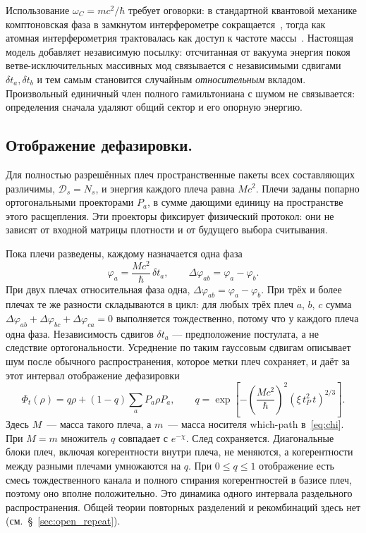 \documentclass[12pt,a4paper]{article}
\begin{document}
Использование $\omega_C=mc^2/\hbar$ требует оговорки: в стандартной квантовой механике комптоновская фаза в замкнутом интерферометре сокращается~\cite{wolf2011compton}, тогда как атомная интерферометрия трактовалась как доступ к частоте массы~\cite{lan2013clock}. Настоящая модель добавляет независимую посылку: отсчитанная от вакуума энергия покоя ветве-исключительных массивных мод связывается с независимыми сдвигами $\delta t_a,\delta t_b$ и тем самым становится случайным \emph{относительным} вкладом. Произвольный единичный член полного гамильтониана с шумом не связывается: определения сначала удаляют общий сектор и его опорную энергию.

\subsection{Отображение дефазировки.}
\label{sec:map}
Для полностью разрешённых плеч пространственные пакеты всех составляющих различимы, $\mathcal D_s=N_s$, и энергия каждого плеча равна $Mc^2$. Плечи заданы попарно ортогональными проекторами $P_a$, в сумме дающими единицу на пространстве этого расщепления. Эти проекторы фиксирует физический протокол: они не зависят от входной матрицы плотности и от будущего выбора считывания.

Пока плечи разведены, каждому назначается одна фаза
\begin{equation}
\varphi_a=\frac{Mc^2}{\hbar}\,\delta t_a,
\qquad
\Delta\varphi_{ab}=\varphi_a-\varphi_b.
\label{eq:arm_phase}
\end{equation}
При двух плечах относительная фаза одна, $\Delta\varphi_{ab}=\varphi_a-\varphi_b$. При трёх и более плечах те же разности складываются в цикл: для любых трёх плеч $a$, $b$, $c$ сумма $\Delta\varphi_{ab}+\Delta\varphi_{bc}+\Delta\varphi_{ca}=0$ выполняется тождественно, потому что у каждого плеча одна фаза. Независимость сдвигов $\delta t_a$ --- предположение постулата, а не следствие ортогональности. Усреднение по таким гауссовым сдвигам описывает шум после обычного распространения, которое метки плеч сохраняет, и даёт за этот интервал отображение дефазировки
\begin{equation}
\Phi_t(\rho)=q\rho+(1-q)\sum_a P_a\rho P_a,
\qquad
q=\exp\!\left[-\left(\frac{Mc^2}{\hbar}\right)^2
(\xi\,t_P^2\,t)^{2/3}\right].
\label{eq:phi_map}
\end{equation}
Здесь $M$~--- масса такого плеча, а $m$~--- масса носителя which-path в~\eqref{eq:chi}. При $M=m$ множитель $q$ совпадает с $e^{-\chi}$. След сохраняется. Диагональные блоки плеч, включая когерентности внутри плеча, не меняются, а когерентности между разными плечами умножаются на $q$. При $0\le q\le 1$ отображение есть смесь тождественного канала и полного стирания когерентностей в базисе плеч, поэтому оно вполне положительно. Это динамика одного интервала раздельного распространения. Общей теории повторных разделений и рекомбинаций здесь нет (см.~\S~\ref{sec:open_repeat}).
\end{document}
